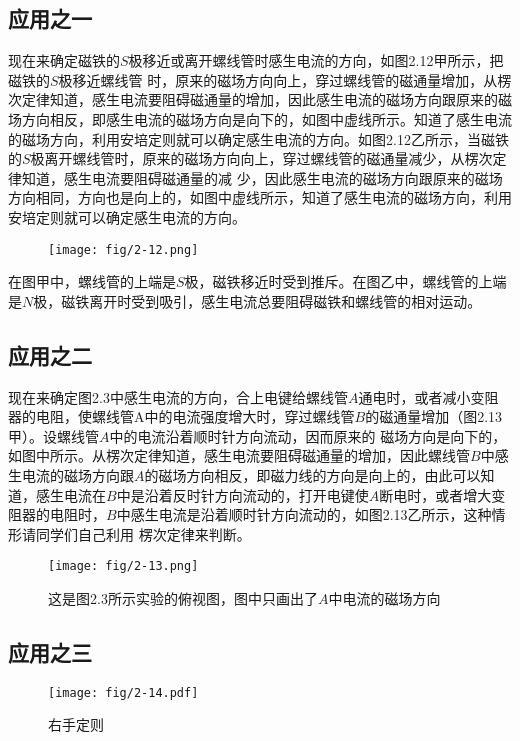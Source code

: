 \subsection*{应用之一}


现在来确定磁铁的$S$极移近或离开螺线管时感生电流的方向，如图2.12甲所示，把磁铁的$S$极移近螺线管
时，原来的磁场方向向上，穿过螺线管的磁通量增加，从楞次定律知道，感生电流要阻碍磁通量的增加，因此感生电流的磁场方向跟原来的磁场方向相反，即感生电流的磁场方向是向下的，如图中虚线所示。知道了感生电流的磁场方向，利用安培定则就可以确定感生电流的方向。如图2.12乙所示，当磁铁的$S$极离开螺线管时，原来的磁场方向向上，穿过螺线管的磁通量减少，从楞次定律知道，感生电流要阻碍磁通量的减
少，因此感生电流的磁场方向跟原来的磁场方向相同，方向也是向上的，如图中虚线所示，知道了感生电流的磁场方向，利用安培定则就可以确定感生电流的方向。
\begin{figure}[htp]\centering
\texttt{[image: fig/2-12.png]}
\caption{}
\end{figure}

在图甲中，螺线管的上端是$S$极，磁铁移近时受到推斥。在图乙中，螺线管的上端是$N$极，磁铁离开时受到吸引，感生电流总要阻碍磁铁和螺线管的相对运动。

\subsection*{应用之二}


现在来确定图2.3中感生电流的方向，合上电键给螺线管$A$通电时，或者减小变阻器的电阻，使螺线管A中的电流强度增大时，穿过螺线管$B$的磁通量增加（图2.13甲）。设螺线管$A$中的电流沿着顺时针方向流动，因而原来的
磁场方向是向下的，如图中所示。从楞次定律知道，感生电流要阻碍磁通量的增加，因此螺线管$B$中感生电流的磁场方向跟$A$的磁场方向相反，即磁力线的方向是向上的，由此可以知道，感生电流在$B$中是沿着反时针方向流动的，打开电键使$A$断电时，或者增大变阻器的电阻时，$B$中感生电流是沿着顺时针方向流动的，如图2.13乙所示，这种情形请同学们自己利用
楞次定律来判断。
\begin{figure}[htp]\centering
\texttt{[image: fig/2-13.png]}
\caption{这是图2.3所示实验的俯视图，图中只画出了$A$中电流的磁场方向}
\end{figure}

\subsection*{应用之三} 
\begin{figure}[htp]\centering
\texttt{[image: fig/2-14.pdf]}
\caption{右手定则}
\end{figure}


